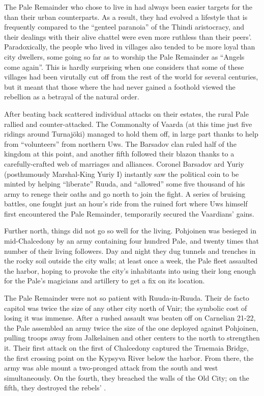 \documentclass[12pt]{report}
\begin{document}
The Pale Remainder who chose to live in  had always
been easier targets for the {\aemott} than their urban counterparts.
As a result, they had evolved a lifestyle that is frequently compared
to the ``genteel paranoia'' of the Thindi aristocracy, and their
dealings with their alive chattel were even more ruthless than their
peers'.  Paradoxically, the people who lived in 
villages also tended to be more loyal than city dwellers, some going
so far as to worship the Pale Remainder as ``Angels come again''.  This
is hardly surprising when one considers that some of these villages
had been virutally cut off from the rest of the world for several
centuries, but it meant that those where the {\aemott} had never
gained a foothold viewed the rebellion as a betrayal of the natural
order.

After beating back scattered individual attacks on their estates, the
rural Pale rallied and counter-attacked.  The Commonalty of Vaarda (at
this time just five ridings around Turnaj\"{o}ki) managed to hold them
off, in large part thanks to help from ``volunteers'' from northern Uws.
The Barsadov clan ruled half of the kingdom at this point, and another
fifth followed their blazon thanks to a carefully-crafted web of
marriages and alliances.  Coronel Barsadov ard Yuriy (posthumously
Marshal-King Yuriy I) instantly saw the political coin to be minted by
helping ``liberate'' Ruuda, and ``allowed'' some five thousand of his army
to renege their oaths and go north to join the fight.  A series of
bruising battles, one fought just an hour's ride from the ruined fort
where Uws himself first encountered the Pale Remainder, temporarily
secured the Vaardians' gains.

Further north, things did not go so well for the living.  Pohjoinen
was besieged in mid-Chalcedony by an army containing four hundred
Pale, and twenty times that number of their living followers.  Day and
night they dug tunnels and trenches in the rocky soil outside the city
walls; at least once a week, the Pale fleet assaulted the harbor,
hoping to provoke the city's inhabitants into using their
 long enough for the Pale's magicians and artillery
to get a fix on its location.

The Pale Remainder were not so patient with Ruuda-in-Ruuda.  Their de
facto capitol was twice the size of any other city north of Vnir; the
symbolic cost of losing it was immense.  After a rushed assault was
beaten off on Carnelian 21-22, the Pale assembled an army twice the
size of the one deployed against Pohjoinen, pulling troops away from
Jalkelainen and other centers to the north to strengthen it.  Their
first attack on the first of Chalcedony captured the Trnemaia Bridge,
the first crossing point on the Kypsyva River below the harbor.  From
there, the army was able mount a two-pronged attack from the south and
west simultaneously.  On the fourth, they breached the walls of the
Old City; on the fifth, they destroyed the rebels' .
\end{document}

